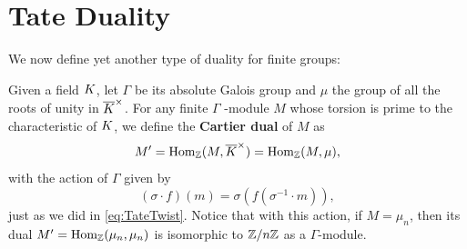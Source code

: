 \documentclass[a4paper, oneside]{memoir}
\begin{document}
\section{Tate Duality}
We now define yet another type of duality for finite groups:
\begin{definition}
	Given a field \(K\), let  $\Gamma$ be its absolute Galois group and $\mu$ the group of all the roots of unity in $\overline{K}^\times$.
	For any finite \(\Gamma\) -module \(M\) whose torsion is prime to the characteristic of \(K\), we define the \textbf{Cartier dual} of $M$ as
	\begin{equation*}
		M^{\prime} = \operatorname{Hom}_{\mathbb{Z}}(M, \overline{K}^\times)=\operatorname{Hom}_{\mathbb{Z}}(M, \mu),
	\end{equation*}
	with the action of $\Gamma$ given by
	\begin{equation*}
		(\sigma \cdot f)(m) = \sigma(f(\sigma^{-1}\cdot m)),
	\end{equation*}
	just as we did in \eqref{eq:TateTwist}.
	Notice that with this action, if $M=\mu_n$, then its dual $M^{\prime} = \operatorname{Hom}_{\mathbb{Z}}(\mu_n, \mu_n)$ is isomorphic to $\mathbb{Z}/n\mathbb{Z}$ as a $\Gamma$-module.
\end{definition}
\end{document}
